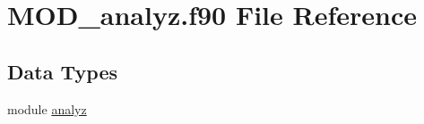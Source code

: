 \hypertarget{MOD__analyz_8f90}{\section{M\-O\-D\-\_\-analyz.\-f90 File Reference}
\label{MOD__analyz_8f90}
}
\subsection*{Data Types}
\begin{DoxyCompactItemize}
\item 
module \hyperlink{classanalyz}{analyz}
\end{DoxyCompactItemize}
